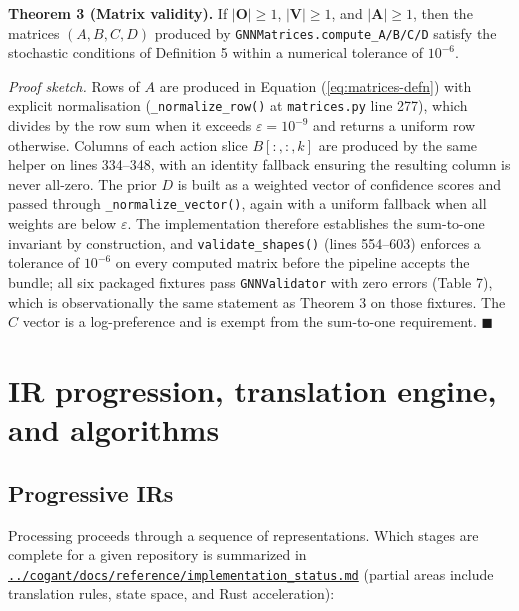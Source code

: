 \documentclass[
]{article}
\begin{document}
\textbf{Theorem 3 (Matrix validity).} If \(|\mathbf{O}| \geq 1\),
\(|\mathbf{V}| \geq 1\), and \(|\mathbf{A}| \geq 1\), then the matrices
\((A, B, C, D)\) produced by \texttt{GNNMatrices.compute\_A/B/C/D}
satisfy the stochastic conditions of Definition 5 within a numerical
tolerance of \(10^{-6}\).

\emph{Proof sketch.} Rows of \(A\) are produced in Equation
(\ref{eq:matrices-defn}) with explicit normalisation
(\texttt{\_normalize\_row()} at \texttt{matrices.py} line 277), which
divides by the row sum when it exceeds \(\varepsilon = 10^{-9}\) and
returns a uniform row otherwise. Columns of each action slice
\(B[:,:,k]\) are produced by the same helper on lines 334--348, with an
identity fallback ensuring the resulting column is never all-zero. The
prior \(D\) is built as a weighted vector of confidence scores and
passed through \texttt{\_normalize\_vector()}, again with a uniform
fallback when all weights are below \(\varepsilon\). The implementation
therefore establishes the sum-to-one invariant by construction, and
\texttt{validate\_shapes()} (lines 554--603) enforces a tolerance of
\(10^{-6}\) on every computed matrix before the pipeline accepts the
bundle; all six packaged fixtures pass \texttt{GNNValidator} with zero
errors (Table 7), which is observationally the same statement as Theorem
3 on those fixtures. The \(C\) vector is a log-preference and is exempt
from the sum-to-one requirement. \(\blacksquare\)

\newpage

\section{IR progression, translation engine, and
algorithms}\label{ir-progression-translation-engine-and-algorithms}

\subsection{Progressive IRs}\label{progressive-irs}

Processing proceeds through a sequence of representations. Which stages
are complete for a given repository is summarized in
\href{../cogant/docs/reference/implementation_status.md}{\texttt{../cogant/docs/reference/implementation\_status.md}}
(partial areas include translation rules, state space, and Rust
acceleration):
\end{document}
